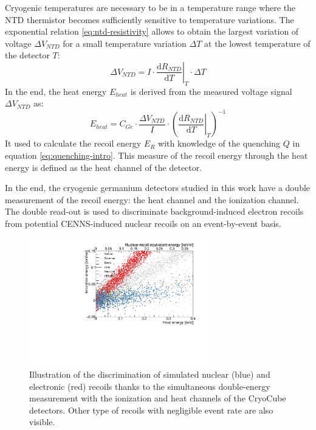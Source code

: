 Cryogenic temperatures are necessary to be in a temperature range where the NTD thermistor becomes sufficiently sensitive to temperature variations. The exponential relation \ref{eq:ntd-resistivity} allows to obtain the largest variation of voltage $\Delta V_{NTD}$ for a small temperature variation $\Delta T$ at the lowest temperature of the detector $T$:
\begin{equation}
\Delta V_{NTD} = 
I \cdot
\left. \frac{\mathrm{d}R_{NTD}}{\mathrm{d}T} \right|_{T}
\cdot
\Delta T
\end{equation}
In the end, the heat energy $E_{heat}$ is derived from the measured voltage signal $\Delta V_{NTD}$ as:
\begin{equation}
E_{heat} = C_{Ge} \cdot \frac{\Delta V_{NTD}}{I} \cdot
\left( \left. \frac{\mathrm{d}R_{NTD}}{\mathrm{d}T} \right|_{T} \right)^{-1}
\end{equation}
It used to calculate the recoil energy $E_R$ with knowledge of the quenching $Q$ in equation \ref{eq:quenching-intro}. This measure of the recoil energy through the heat energy is defined as the heat channel of the detector.

In the end, the cryogenic germanium detectors studied in this work have a double measurement of the recoil energy: the heat channel and the ionization channel. The double read-out is used to discriminate background-induced electron recoils from potential CENNS-induced nuclear recoils on an event-by-event basis.

\begin{figure}
\centering
\includegraphics [width=0.7\textwidth]{Figures/Experiment/discrimination_simulation.pdf}
\caption{Illustration of the discrimination of simulated nuclear (blue) and electronic (red) recoils thanks to the simultaneous double-energy measurement with the ionization and heat channels  of the CryoCube detectors. Other type of recoils with negligible event rate are also visible.}
\label{fig:discrimination-simulation}
\end{figure}

